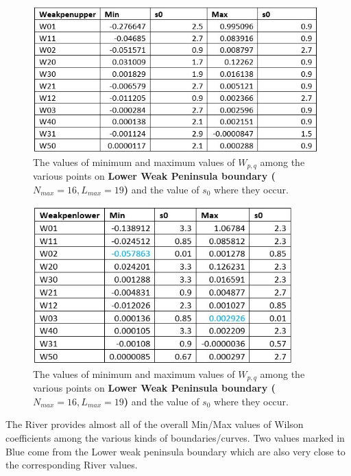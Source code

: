 ﻿\documentclass[12pt,a4paper]{article}
\begin{document}
\begin{figure}[H]
  \centering
  \includegraphics[width=11cm]{TabWPU.jpg}
  \caption{The values of minimum and maximum values of $W_{p,q}$ among the various points on \textbf{Lower Weak Peninsula boundary ($N_{max}=16, L_{max}=19$)} and the value of $s_{0}$ where they occur.}
\end{figure}

\begin{figure}[H]
  \centering
  \includegraphics[width=10cm]{TabWPL.jpg}
  \caption{The values of minimum and maximum values of $W_{p,q}$ among the various points on \textbf{Lower Weak Peninsula boundary ($N_{max}=16, L_{max}=19$)} and the value of $s_{0}$ where they occur.}
\end{figure}
The River provides almost all of the overall Min/Max values of Wilson coefficients among the various kinds of boundaries/curves. Two values marked in Blue come from the Lower weak peninsula boundary which are also very close to the corresponding River values. 
\end{document}
